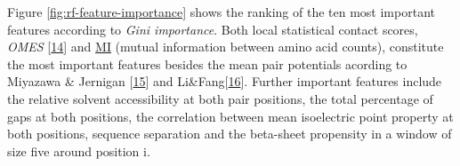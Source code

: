 \documentclass[12pt,a4paper,twoside]{book}
\theoremstyle{definition}
\theoremstyle{definition}
\theoremstyle{remark}
\begin{document}
Figure \ref{fig:rf-feature-importance} shows the ranking of the ten most
important features according to \emph{Gini importance}. Both local
statistical contact scores, \emph{OMES}
{[}\protect\hyperlink{ref-Fodor2004a}{14}{]} and
\protect\hyperlink{abbrev}{MI} (mutual information between amino acid
counts), constitute the most important features besides the mean pair
potentials acording to Miyazawa \& Jernigan
{[}\protect\hyperlink{ref-Miyazawa1999a}{15}{]} and
Li\&Fang{[}\protect\hyperlink{ref-Li2011}{16}{]}. Further important
features include the relative solvent accessibility at both pair
positions, the total percentage of gaps at both positions, the
correlation between mean isoelectric point property at both positions,
sequence separation and the beta-sheet propensity in a window of size
five around position i.
\end{document}
